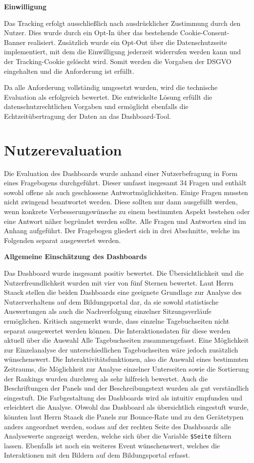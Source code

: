 \textbf{Einwilligung}

Das Tracking erfolgt ausschließlich nach ausdrücklicher Zustimmung durch den Nutzer. Dies wurde durch ein Opt-In über das bestehende Cookie-Consent-Banner realisiert. Zusätzlich wurde ein Opt-Out über die Datenschutzseite implementiert, mit dem die Einwilligung jederzeit widerrufen werden kann und der Tracking-Cookie gelöscht wird. Somit werden die Vorgaben der DSGVO eingehalten und die Anforderung ist erfüllt.

Da alle Anforderung vollständig umgesetzt wurden, wird die technische Evaluation als erfolgreich bewertet. Die entwickelte Lösung erfüllt die datenschutzrechtlichen Vorgaben und ermöglicht ebenfalls die Echtzeitübertragung der Daten an das Dashboard-Tool. 

\section{Nutzerevaluation}
\label{sec:nutzer-evaluation}
Die Evaluation des Dashboards wurde anhand einer Nutzerbefragung in Form eines Fragebogens durchgeführt. Dieser umfasst insgesamt 34 Fragen und enthält sowohl offene als auch geschlossene Antwortmöglichkeiten. Einige Fragen mussten nicht zwingend beantwortet werden. Diese sollten nur dann ausgefüllt werden, wenn konkrete Verbesserungswünsche zu einem bestimmten Aspekt bestehen oder eine Antwort näher begründet werden sollte. Alle Fragen und Antworten sind im Anhang aufgeführt. Der Fragebogen gliedert sich in drei Abschnitte, welche im Folgenden separat ausgewertet werden.

\textbf{Allgemeine Einschätzung des Dashboards}

Das Dashboard wurde insgesamt positiv bewertet. Die Übersichtlichkeit und die Nutzerfreundlichkeit wurden mit vier von fünf Sternen bewertet. Laut Herrn Staack stellen die beiden Dashboards eine geeignete Grundlage zur Analyse des Nutzerverhaltens auf dem Bildungsportal dar, da sie sowohl statistische Auswertungen als auch die Nachverfolgung einzelner Sitzungsverläufe ermöglichen. Kritisch angemerkt wurde, dass einzelne Tagebuchseiten nicht separat ausgewertet werden können. Die Interaktionsdaten für diese werden aktuell über die Auswahl \glqq Alle Tagebuchseiten\grqq{} zusammengefasst. Eine Möglichkeit zur Einzelanalyse der unterschiedlichen Tagebuchseiten wäre jedoch zusätzlich wünschenswert. Die Interaktivitätsfunktionen, also die Auswahl eines bestimmten Zeitraums, die Möglichkeit zur Analyse einzelner Unterseiten sowie die Sortierung der Rankings wurden durchweg als sehr hilfreich bewertet. Auch die Beschriftungen der Panels und der Beschreibungstext wurden als gut verständlich eingestuft. Die Farbgestaltung des Dashboards wird als intuitiv empfunden und erleichtert die Analyse. Obwohl das Dashboard als übersichtlich eingestuft wurde, könnten laut Herrn Staack die Panels zur Bounce-Rate und zu den Gerätetypen anders angeordnet werden, sodass auf der rechten Seite des Dashboards alle Analysewerte angezeigt werden, welche sich über die Variable \texttt{\$Seite} filtern lassen. Ebenfalls ist noch ein weiteres Event wünschenswert, welches die Interaktionen mit den Bildern auf dem Bildungsportal erfasst. 

